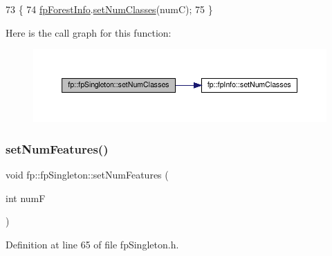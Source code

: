 \begin{DoxyCode}
73                                                \{
74                 \hyperlink{classfp_1_1fpSingleton_a85965009befa72a749ae498fa5b6ccfa}{fpForestInfo}.\hyperlink{classfp_1_1fpInfo_a577f80c50c60a7e48bb6ca444843cdba}{setNumClasses}(numC);
75             \}
\end{DoxyCode}
Here is the call graph for this function\+:
\nopagebreak
\begin{figure}[H]
\begin{center}
\leavevmode
\includegraphics[width=350pt]{classfp_1_1fpSingleton_a499e7cef6b463cc24590d05a0d0e6e1c_cgraph}
\end{center}
\end{figure}
\mbox{\label{classfp_1_1fpSingleton_a5a35867349f6d172f77af7026fdaecbe}} 
\subsubsection{\texorpdfstring{set\+Num\+Features()}{setNumFeatures()}}
{\footnotesize\ttfamily void fp\+::fp\+Singleton\+::set\+Num\+Features (\begin{DoxyParamCaption}\item[{int}]{numF }\end{DoxyParamCaption})\hspace{0.3cm}{\ttfamily [inline]}}



Definition at line 65 of file fp\+Singleton.\+h.


